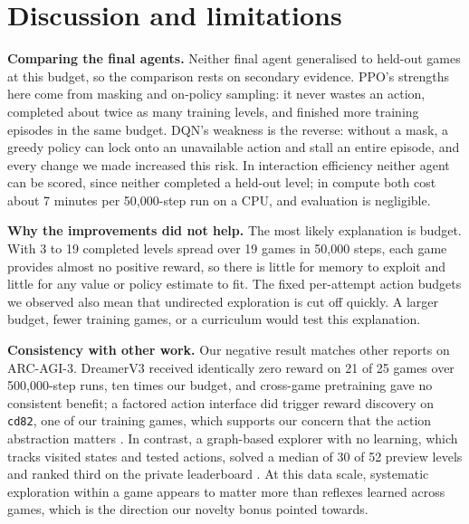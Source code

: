\documentclass[10pt]{article}
\begin{document}
\section{Discussion and limitations}
\label{sec:discussion}

\textbf{Comparing the final agents.} Neither final agent generalised to held-out games at this budget, so the comparison rests on secondary evidence. PPO's strengths here come from masking and on-policy sampling: it never wastes an action, completed about twice as many training levels, and finished more training episodes in the same budget. DQN's weakness is the reverse: without a mask, a greedy policy can lock onto an unavailable action and stall an entire episode, and every change we made increased this risk. In interaction efficiency neither agent can be scored, since neither completed a held-out level; in compute both cost about 7 minutes per 50,000-step run on a CPU, and evaluation is negligible.

\textbf{Why the improvements did not help.} The most likely explanation is budget. With 3 to 19 completed levels spread over 19 games in 50,000 steps, each game provides almost no positive reward, so there is little for memory to exploit and little for any value or policy estimate to fit. The fixed per-attempt action budgets we observed also mean that undirected exploration is cut off quickly. A larger budget, fewer training games, or a curriculum would test this explanation.

\textbf{Consistency with other work.} Our negative result matches other reports on ARC-AGI-3. DreamerV3 received identically zero reward on 21 of 25 games over 500,000-step runs, ten times our budget, and cross-game pretraining gave no consistent benefit; a factored action interface did trigger reward discovery on \texttt{cd82}, one of our training games, which supports our concern that the action abstraction matters \citep{ahmad2026competence}. In contrast, a graph-based explorer with no learning, which tracks visited states and tested actions, solved a median of 30 of 52 preview levels and ranked third on the private leaderboard \citep{rudakov2025graph}. At this data scale, systematic exploration within a game appears to matter more than reflexes learned across games, which is the direction our novelty bonus pointed towards.
\end{document}
